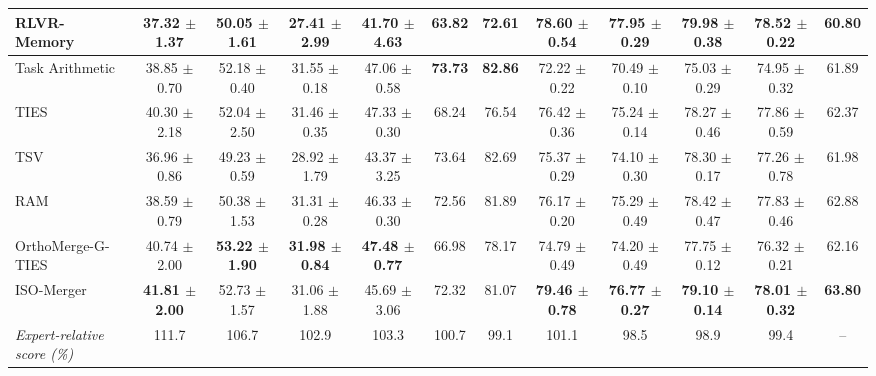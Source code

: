 \documentclass[11pt, a4paper]{utda}
\theoremstyle{plain}
\theoremstyle{definition}
\theoremstyle{remark}
\begin{document}
\begin{table}[h]
{\begin{tabular}{l cccc cc cccc c}
\rowcolor{expertcolor}
RLVR-Memory~\cite{yu2025memagent} & 37.32 $\pm$ 1.37 & \textbf{50.05 $\pm$ 1.61} & 27.41 $\pm$ 2.99 & 41.70 $\pm$ 4.63 & 63.82 & 72.61 & \textbf{78.60 $\pm$ 0.54} & \textbf{77.95 $\pm$ 0.29} & \textbf{79.98 $\pm$ 0.38} & \textbf{78.52 $\pm$ 0.22} & \textbf{60.80} \\
\midrule
Task Arithmetic~\cite{ta} & 38.85 $\pm$ 0.70 & 52.18 $\pm$ 0.40 & 31.55 $\pm$ 0.18 & 47.06 $\pm$ 0.58 & \textbf{73.73} & \textbf{82.86} & 72.22 $\pm$ 0.22 & 70.49 $\pm$ 0.10 & 75.03 $\pm$ 0.29 & 74.95 $\pm$ 0.32 & 61.89 \\
TIES~\cite{ties} & 40.30 $\pm$ 2.18 & 52.04 $\pm$ 2.50 & 31.46 $\pm$ 0.35 & 47.33 $\pm$ 0.30 & 68.24 & 76.54 & 76.42 $\pm$ 0.36 & 75.24 $\pm$ 0.14 & 78.27 $\pm$ 0.46 & 77.86 $\pm$ 0.59 & 62.37 \\
TSV~\cite{tsv} & 36.96 $\pm$ 0.86 & 49.23 $\pm$ 0.59 & 28.92 $\pm$ 1.79 & 43.37 $\pm$ 3.25 & 73.64 & 82.69 & 75.37 $\pm$ 0.29 & 74.10 $\pm$ 0.30 & 78.30 $\pm$ 0.17 & 77.26 $\pm$ 0.78 & 61.98 \\
RAM~\cite{ram} & 38.59 $\pm$ 0.79 & 50.38 $\pm$ 1.53 & 31.31 $\pm$ 0.28 & 46.33 $\pm$ 0.30 & 72.56 & 81.89 & 76.17 $\pm$ 0.20 & 75.29 $\pm$ 0.49 & 78.42 $\pm$ 0.47 & 77.83 $\pm$ 0.46 & 62.88 \\
OrthoMerge-G-TIES~\cite{yang2026orthogonal}  & 40.74 $\pm$ 2.00 & \textbf{53.22 $\pm$ 1.90} & \textbf{31.98 $\pm$ 0.84} & \textbf{47.48 $\pm$ 0.77} & 66.98 & 78.17 & 74.79 $\pm$ 0.49 & 74.20 $\pm$ 0.49 & 77.75 $\pm$ 0.12 & 76.32 $\pm$ 0.21  & 62.16\\
\midrule
\rowcolor{ourcolor}ISO-Merger & \textbf{41.81 $\pm$ 2.00} & 52.73 $\pm$ 1.57 & 31.06 $\pm$ 1.88 & 45.69 $\pm$ 3.06 & 72.32 & 81.07 & \textbf{79.46 $\pm$ 0.78} & \textbf{76.77 $\pm$ 0.27} & \textbf{79.10 $\pm$ 0.14} & \textbf{78.01 $\pm$ 0.32} & \textbf{63.80} \\
\rowcolor{ourcolor}
\quad\textit{Expert-relative score (\%)} & 111.7 & 106.7 & 102.9 & 103.3 & 100.7 & 99.1 & 101.1 & 98.5 & 98.9 & 99.4 & -- \\
\bottomrule
\end{tabular}
}
\end{table}
\end{document}
